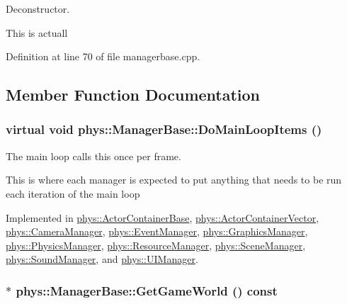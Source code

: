 Deconstructor. 

This is actuall 

Definition at line 70 of file managerbase.cpp.



\subsection{Member Function Documentation}
\hypertarget{classphys_1_1ManagerBase_aa9e13a3f7c398b708f0f242610b5abf7}{
\subsubsection[{DoMainLoopItems}]{\setlength{\rightskip}{0pt plus 5cm}virtual void phys::ManagerBase::DoMainLoopItems ()}}
\label{d2/de3/classphys_1_1ManagerBase_aa9e13a3f7c398b708f0f242610b5abf7}


The main loop calls this once per frame. 

This is where each manager is expected to put anything that needs to be run each iteration of the main loop 

Implemented in \hyperlink{classphys_1_1ActorContainerBase_a67fbde6a61602253f66fecd0416bdc2f}{phys::ActorContainerBase}, \hyperlink{classphys_1_1ActorContainerVector_a883e59ac1674421bac143088a6cf07c8}{phys::ActorContainerVector}, \hyperlink{classphys_1_1CameraManager_aaae22266bccc43f6efa66d2735d7d1d3}{phys::CameraManager}, \hyperlink{classphys_1_1EventManager_aca8fb3d285484dcdb943824bf11f3596}{phys::EventManager}, \hyperlink{classphys_1_1GraphicsManager_a72e5dc563c6947cded348f19d3df41ee}{phys::GraphicsManager}, \hyperlink{classphys_1_1PhysicsManager_a62741a2582ac9bfd0255cf8a3ad2310c}{phys::PhysicsManager}, \hyperlink{classphys_1_1ResourceManager_a2114714999441c095bc28d3673c2490e}{phys::ResourceManager}, \hyperlink{classphys_1_1SceneManager_a27a3f6b21e15f628642b1cad524f1a18}{phys::SceneManager}, \hyperlink{classphys_1_1SoundManager_a577b228753ea19856b8476ab831e547e}{phys::SoundManager}, and \hyperlink{classphys_1_1UIManager_a972abedcd4343dc5966580f2f82494a8}{phys::UIManager}.

\hypertarget{classphys_1_1ManagerBase_addfd62fbc444ca4c2aba40768d1b284e}{
\subsubsection[{GetGameWorld}]{ $\ast$ phys::ManagerBase::GetGameWorld () const}}
\label{d2/de3/classphys_1_1ManagerBase_addfd62fbc444ca4c2aba40768d1b284e}


